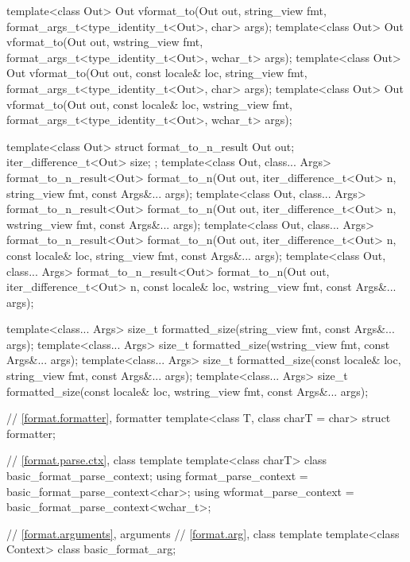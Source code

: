\begin{codeblock}
{  template<class Out>
    Out vformat_to(Out out, string_view fmt,
                   format_args_t<type_identity_t<Out>, char> args);
  template<class Out>
    Out vformat_to(Out out, wstring_view fmt,
                   format_args_t<type_identity_t<Out>, wchar_t> args);
  template<class Out>
    Out vformat_to(Out out, const locale& loc, string_view fmt,
                   format_args_t<type_identity_t<Out>, char> args);
  template<class Out>
    Out vformat_to(Out out, const locale& loc, wstring_view fmt,
                   format_args_t<type_identity_t<Out>, wchar_t> args);

  template<class Out> struct format_to_n_result {
    Out out;
    iter_difference_t<Out> size;
  };
  template<class Out, class... Args>
    format_to_n_result<Out> format_to_n(Out out, iter_difference_t<Out> n,
                                        string_view fmt, const Args&... args);
  template<class Out, class... Args>
    format_to_n_result<Out> format_to_n(Out out, iter_difference_t<Out> n,
                                        wstring_view fmt, const Args&... args);
  template<class Out, class... Args>
    format_to_n_result<Out> format_to_n(Out out, iter_difference_t<Out> n,
                                        const locale& loc, string_view fmt,
                                        const Args&... args);
  template<class Out, class... Args>
    format_to_n_result<Out> format_to_n(Out out, iter_difference_t<Out> n,
                                        const locale& loc, wstring_view fmt,
                                        const Args&... args);

  template<class... Args>
    size_t formatted_size(string_view fmt, const Args&... args);
  template<class... Args>
    size_t formatted_size(wstring_view fmt, const Args&... args);
  template<class... Args>
    size_t formatted_size(const locale& loc, string_view fmt, const Args&... args);
  template<class... Args>
    size_t formatted_size(const locale& loc, wstring_view fmt, const Args&... args);

  // \ref{format.formatter}, formatter
  template<class T, class charT = char> struct formatter;

  // \ref{format.parse.ctx}, class template 
  template<class charT> class basic_format_parse_context;
  using format_parse_context = basic_format_parse_context<char>;
  using wformat_parse_context = basic_format_parse_context<wchar_t>;

  // \ref{format.arguments}, arguments
  // \ref{format.arg}, class template 
  template<class Context> class basic_format_arg;

}
\end{codeblock}
